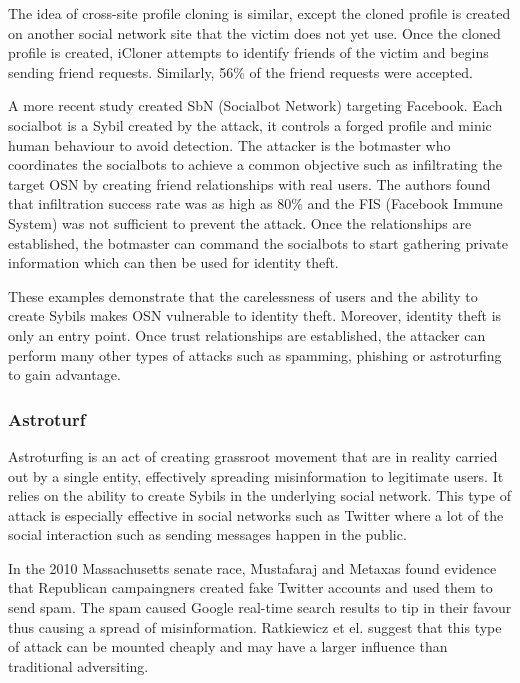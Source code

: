 The idea of cross-site profile cloning is similar, except the cloned profile is
created on another social network site that the victim does not yet use. Once
the cloned profile is created, iCloner attempts to identify friends of the
victim and begins sending friend requests. Similarly, 56\% of the friend
requests were accepted. 

A more recent study created SbN (Socialbot Network) targeting
Facebook\cite{boshmaf2011socialbot}. Each socialbot is a Sybil created by the
attack, it controls a forged profile and minic human behaviour to avoid
detection. The attacker is the botmaster who coordinates the socialbots to
achieve a common objective such as infiltrating the target OSN by creating
friend relationships with real users. The authors found that infiltration
success rate was as high as 80\% and the FIS\cite{stein2011facebook} (Facebook
Immune System) was not sufficient to prevent the attack. Once the relationships
are established, the botmaster can command the socialbots to start gathering
private information which can then be used for identity theft.


These examples demonstrate that the carelessness of users and the ability to
create Sybils makes OSN vulnerable to identity theft. Moreover, identity theft
is only an entry point. Once trust relationships are established, the attacker
can perform many other types of attacks such as spamming, phishing or
astroturfing to gain advantage.

\subsubsection{Astroturf}
Astroturfing is an act of creating grassroot movement that are in reality
carried out by a single entity, effectively spreading misinformation to
legitimate users. It relies on the ability to create Sybils in the underlying
social network. This type of attack is especially effective in social networks
such as Twitter where a lot of the social interaction such as sending messages
happen in the public.

In the 2010 Massachusetts senate race, Mustafaraj and Metaxas found evidence
that Republican campaingners created fake Twitter accounts and used them to send
spam. The spam caused Google real-time search results to tip in their favour
thus causing a spread of misinformation\cite{mustafaraj2010obscurity}.
Ratkiewicz et el. suggest that this type of attack can be mounted cheaply and
may have a larger influence than traditional
adversiting\cite{ratkiewicz2011truthy}.

